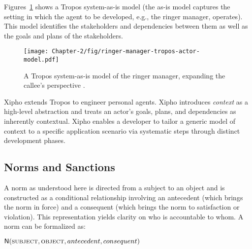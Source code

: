 \documentclass[11pt,          %
               phd,           %
               onehalfspacing %
               ]{ncsuthesis}
\newcommand{\fsc}{\textsc}
\newcommand{\msf}{\mathsf}
\newcommand{\N}{\msf{N}}
\begin{document}
Figures~\ref{fig:xipho-ringer-as-is} shows a Tropos system-as-is model
(the as-is model captures the setting in which the agent to be
developed, e.g., the ringer manager, operates). This model identifies the
stakeholders and dependencies between them as well as the goals and
plans of the stakeholders.

\begin{figure}[!htb] \centering
\texttt{[image: Chapter-2/fig/ringer-manager-tropos-actor-model.pdf]}
\caption[A Tropos model of the ringer manager.]{A Tropos system-as-is model of the ringer manager, expanding the callee's perspective \protect\citep{Murukannaiah-AAMAS14-Xipho}.}
\label{fig:xipho-ringer-as-is} \end{figure}

Xipho \citep{Murukannaiah-AAMAS14-Xipho} extends Tropos to engineer
personal agents. Xipho introduces \emph{context} as a high-level
abstraction and treats an actor's goals, plans, and dependencies as
inherently contextual. Xipho enables a developer to tailor a generic
model of context to a specific application scenario via systematic steps
through distinct development phases.

\subsection{Norms and Sanctions}

A norm as understood here \citep{Singh-2013-Norms} is directed from a
subject to an object and is constructed as a conditional relationship
involving an antecedent (which brings the norm in force) and a
consequent (which brings the norm to satisfaction or violation). This
representation yields clarity on who is accountable to whom. A norm can
be formalized as:
%
\begin{center}
$\N(\fsc{subject},\fsc{object}, antecedent, consequent)$
\end{center}
\end{document}

